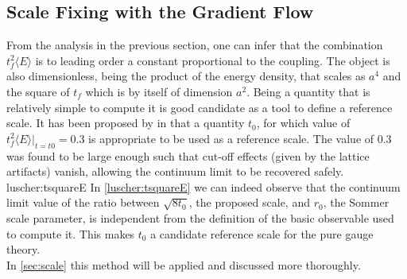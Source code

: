 \subsection{Scale Fixing with the Gradient Flow}
\label{sec:scale_fixing}
From the analysis in the previous section, one can infer that the combination $t_f^2\langle E\rangle$ is to leading order a constant proportional to the coupling. The object is also dimensionless, being the product of the energy density, that scales as $a^4$ and the square of $t_f$ which is by itself of dimension $a^2$. Being a quantity that is relatively simple to compute it is  good candidate as a tool to define a reference scale. 
It has been proposed by in \cite{luscher_properties_2010} that a quantity $t_0$, for which value of $t_f^2\langle E\rangle \vert_{t=t0}= 0.3$ is appropriate to be used as a reference scale. The value of $0.3$ was found to be large enough such that cut-off effects (given by the lattice artifacts) vanish, allowing the continuum limit to be recovered safely. 
 {luscher:tsquareE}
In \cref{luscher:tsquareE} we can indeed observe that the continuum limit value of the ratio between $\sqrt{8t_0}$, the proposed scale, and $r_0$, the Sommer scale parameter, is independent from the definition of the basic observable used to compute it. This makes $t_0$ a candidate reference scale for the pure gauge theory.\\
In \cref{sec:scale} this method will be applied and discussed more thoroughly.
 
